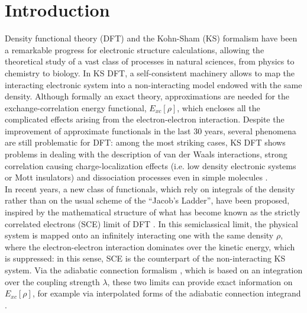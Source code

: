 \documentclass[aps,pra,twocolumn,superscriptaddress]{revtex4}
\begin{document}
\maketitle

\section{Introduction}
\label{sec:intro}
Density functional theory (DFT) \citep{Koh-RMP-99} and the Kohn-Sham (KS) formalism \citep{KohSha-PR-65} have been a remarkable progress for electronic structure calculations, allowing the theoretical study of a vast class of processes in natural sciences, from physics to chemistry to biology.
In KS DFT, a self-consistent machinery allows to map the interacting electronic system into a non-interacting model endowed with the same density. Although formally an exact theory, approximations are needed for the exchange-correlation energy functional, $E_{xc}[\rho]$, which encloses all the complicated effects arising from the electron-electron interaction. Despite the improvement of approximate functionals in the last 30 years, several phenomena are still problematic for DFT: among the most striking cases, KS DFT shows problems in dealing with the description of van der Waals interactions, strong correlation causing charge-localization effects (i.e. low density electronic systems or Mott insulators) and dissociation processes even in simple molecules \cite{CohMorYan-SCI-08,CohMorYan-CR-12}.
\\In recent years, a new class of functionals, which rely on integrals of the density\cite{WagGor-PRA-14,ZhoBahErn-JCP-15,BahZhoErn-JCP-16,VucIroSavTeaGor-JCTC-16,VucIroWagTeaGor-PCCP-17,VucGor-JPCL-17} rather than on the usual scheme of the ``Jacob's Ladder'', \cite{PerSmi-INC-01} have been proposed, inspired by the mathematical structure of what has become known as the strictly correlated electrons (SCE) limit of DFT \citep{Sei-PRA-99,SeiPerLev-PRA-99,SeiGorSav-PRA-07}.
In this semiclassical limit, the physical system is mapped onto an infinitely interacting one with the same density $\rho$, where the electron-electron interaction dominates over the kinetic energy, which is suppressed: in this sense, SCE is the counterpart of the non-interacting KS system.
Via the adiabatic connection formalism \citep{Har-PRA-84,LanPer-PRB-77,GunLun-PRB-76}, which is based on an integration over the coupling strength $\lambda$, these two limits can provide exact information on $E_{xc}[\rho]$, for example via interpolated forms of the adiabatic connection integrand \cite{SeiPerLev-PRA-99,SeiPerKur-PRL-00,ZhoBahErn-JCP-15,BahZhoErn-JCP-16,VucIroSavTeaGor-JCTC-16,VucIroWagTeaGor-PCCP-17,VucGor-JPCL-17}.\\
\end{document}

